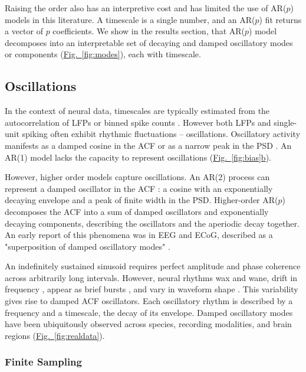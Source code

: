 \documentclass[pdflatex,lineno,sn-nature]{sn-jnl}
\newcommand{\figpanel}[3][]{\hyperref[#2]{Fig.~#1\ref*{#2}#3}}
\theoremstyle{thmstyleone}
\theoremstyle{thmstyletwo}
\theoremstyle{thmstylethree}
\begin{document}
Raising the order also has an interpretive cost and has limited the use of AR($p$) models in this literature. A timescale is a single number, and an AR($p$) fit returns a vector of $p$ coefficients. We show in the results section, that AR($p$) model decomposes into an interpretable set of decaying and damped oscillatory modes or components (\figpanel{fig:modes}{}), each with timescale.

\subsection{Oscillations}

In the context of neural data, timescales are typically estimated from the autocorrelation of LFPs or binned spike counts \cite{murray_hierarchy_2014}. However both LFPs and single-unit spiking often exhibit rhythmic fluctuations -- oscillations. Oscillatory activity manifests as a damped cosine in the ACF \cite{brunel_fast_1999} or as a narrow peak in the PSD \cite{he_scale-free_2014, buzsaki_scaling_2013}. An AR(1) model lacks the capacity to represent oscillations (\figpanel{fig:bias}{b}).

However, higher order models capture oscillations. An AR(2) process can represent a damped oscillator in the ACF \cite{stralrowski_charts_1970}: a cosine with an exponentially decaying envelope and a peak of finite width in the PSD. Higher-order AR($p$) decomposes the ACF into a sum of damped oscillators and exponentially decaying components, describing the oscillators and the aperiodic decay together. An early report of this phenomena was in EEG and ECoG, described as a "superposition of damped oscillatory modes" \cite{Franaszczuk1985}.

An indefinitely sustained sinusoid requires perfect amplitude and phase coherence across arbitrarily long intervals. However, neural rhythms wax and wane, drift in frequency \cite{Myrov2024}, appear as brief bursts \cite{feingold_bursts_2015, Jones2016}, and vary in waveform shape \cite{cole_nonsinusoidal_2017}. This variability gives rise to damped ACF oscillators. Each oscillatory rhythm is described by a frequency and a timescale, the decay of its envelope. Damped oscillatory modes have been ubiquitously observed across species, recording modalities, and brain regions \cite{Sato1977, Neuenschwander1993, CasteloBranco1998, brunel_fast_1999, Brunel2008, Royer2010, Wallace2011, Kulkarni2020, Lima2011, Lombardi2023} (\figpanel{fig:realdata}{}).

\subsubsection{Finite Sampling}
\end{document}
